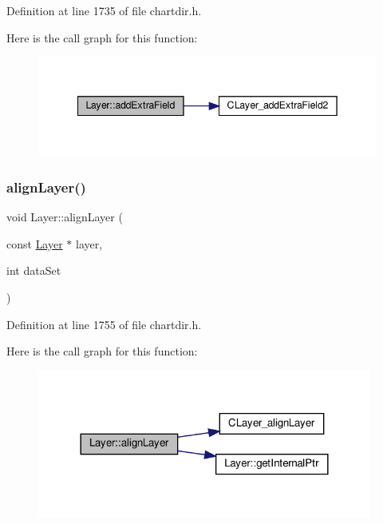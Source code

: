 Definition at line 1735 of file chartdir.\+h.

Here is the call graph for this function\+:
\nopagebreak
\begin{figure}[H]
\begin{center}
\leavevmode
\includegraphics[width=342pt]{class_layer_a309be6ac81b9f7592697fa1ce4a86b71_cgraph}
\end{center}
\end{figure}
\mbox{\label{class_layer_a359f31be37e9bedf43c6c7614042b5e0}} 
\subsubsection{\texorpdfstring{align\+Layer()}{alignLayer()}}
{\footnotesize\ttfamily void Layer\+::align\+Layer (\begin{DoxyParamCaption}\item[{const \hyperlink{class_layer}{Layer} $\ast$}]{layer,  }\item[{int}]{data\+Set }\end{DoxyParamCaption})\hspace{0.3cm}{\ttfamily [inline]}}



Definition at line 1755 of file chartdir.\+h.

Here is the call graph for this function\+:
\nopagebreak
\begin{figure}[H]
\begin{center}
\leavevmode
\includegraphics[width=312pt]{class_layer_a359f31be37e9bedf43c6c7614042b5e0_cgraph}
\end{center}
\end{figure}
\mbox{\label{class_layer_a129db307a7eca2caec1337b22e013d54}} 
